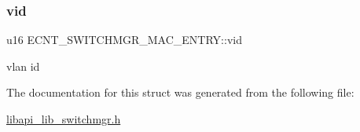 \subsubsection{\texorpdfstring{vid}{vid}}
{\footnotesize\ttfamily u16 E\+C\+N\+T\+\_\+\+S\+W\+I\+T\+C\+H\+M\+G\+R\+\_\+\+M\+A\+C\+\_\+\+E\+N\+T\+R\+Y\+::vid}

vlan id 

The documentation for this struct was generated from the following file\+:\begin{DoxyCompactItemize}
\item 
\hyperlink{libapi__lib__switchmgr_8h}{libapi\+\_\+lib\+\_\+switchmgr.\+h}\end{DoxyCompactItemize}
